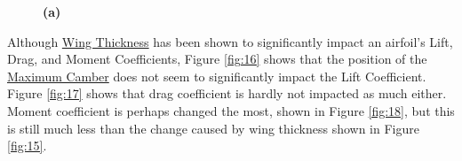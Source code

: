 \documentclass{article}
\begin{document}
\begin{figure}
  \centering
  \caption{ \textbf{(a)} }
  \label{run5}
\end{figure}

Although \hyperlink{Th}{Wing Thickness} has been shown to significantly impact an airfoil's Lift, Drag, and Moment Coefficients, Figure \ref{fig:16} shows that the position of the \hyperlink{Camber}{Maximum Camber} does not seem to significantly impact the Lift Coefficient. Figure \ref{fig:17} shows that drag coefficient is hardly not impacted as much either. Moment coefficient is perhaps changed the most, shown in Figure \ref{fig:18}, but this is still much less than the change caused by wing thickness shown in Figure \ref{fig:15}.
\end{document}
